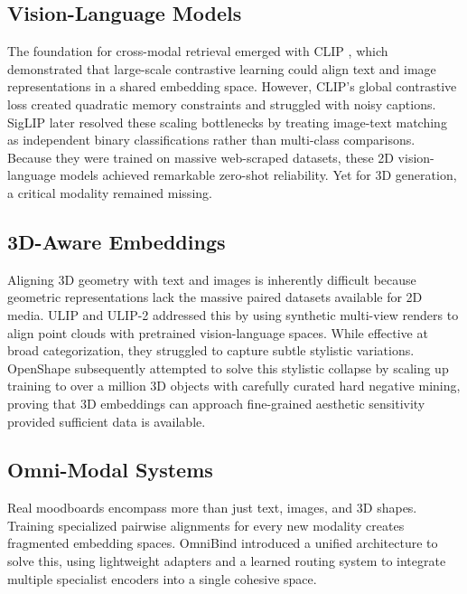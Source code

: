 \subsection{Vision-Language Models}

The foundation for cross-modal retrieval emerged with CLIP \cite{radford2021learningtransferablevisualmodels}, which demonstrated that large-scale contrastive learning could align text and image representations in a shared embedding space. However, CLIP's global contrastive loss created quadratic memory constraints and struggled with noisy captions. SigLIP \cite{zhai2023sigmoidlosslanguageimage} later resolved these scaling bottlenecks by treating image-text matching as independent binary classifications rather than multi-class comparisons. Because they were trained on massive web-scraped datasets, these 2D vision-language models achieved remarkable zero-shot reliability. Yet for 3D generation, a critical modality remained missing.

\subsection{3D-Aware Embeddings}

Aligning 3D geometry with text and images is inherently difficult because geometric representations lack the massive paired datasets available for 2D media. ULIP \cite{xue2023uliplearningunifiedrepresentation} and ULIP-2 \cite{xue2024ulip2scalablemultimodalpretraining} addressed this by using synthetic multi-view renders to align point clouds with pretrained vision-language spaces. While effective at broad categorization, they struggled to capture subtle stylistic variations. OpenShape \cite{liu2023openshapescaling3dshape} subsequently attempted to solve this stylistic collapse by scaling up training to over a million 3D objects with carefully curated hard negative mining, proving that 3D embeddings can approach fine-grained aesthetic sensitivity provided sufficient data is available.

\subsection{Omni-Modal Systems}

Real moodboards encompass more than just text, images, and 3D shapes. Training specialized pairwise alignments for every new modality creates fragmented embedding spaces. OmniBind \cite{wang2024omnibindlargescaleomnimultimodal} introduced a unified architecture to solve this, using lightweight adapters and a learned routing system to integrate multiple specialist encoders into a single cohesive space.

